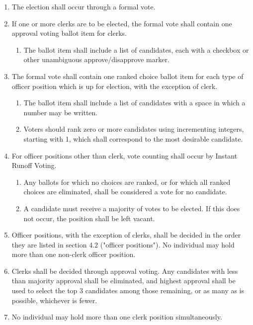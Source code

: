 \documentclass[11pt]{article}
\newcounter{h1}
\newcounter{h2}[h1]
\newcounter{h3}[h2]
\begin{document}
\begin{enumerate}
  \item The election shall occur through a formal vote.  
  \item If one or more clerks are to be elected, the formal vote shall contain one approval voting ballot item for clerks.  
  \begin{enumerate}
    \item The ballot item shall include a list of candidates, each with a checkbox or other unambiguous approve/disapprove marker.  
  \end{enumerate}
  \item The formal vote shall contain one ranked choice ballot item for each type of officer position which is up for election, with the exception of clerk.  
  \begin{enumerate}
    \item The ballot item shall include a list of candidates with a space in which a number may be written.  
    \item Voters should rank zero or more candidates using incrementing integers, starting with 1, which shall correspond to the most desirable candidate.  
  \end{enumerate}
  \item For officer positions other than clerk, vote counting shall occur by Instant Runoff Voting.  
  \begin{enumerate}
    \item Any ballots for which no choices are ranked, or for which all ranked choices are eliminated, shall be considered a vote for no candidate.  
    \item A candidate must receive a majority of votes to be elected. If this does not occur, the position shall be left vacant.  
  \end{enumerate}
  \item Officer positions, with the exception of clerks, shall be decided in the order they are listed in section 4.2 ("officer positions"). No individual may hold more than one non-clerk officer position.  
  \item Clerks shall be decided through approval voting. Any candidates with less than majority approval shall be eliminated, and highest approval shall be used to select the top 3 candidates among those remaining, or as many as is possible, whichever is fewer.  
  \item No individual may hold more than one clerk position simultaneously.
\end{enumerate}
\end{document}
